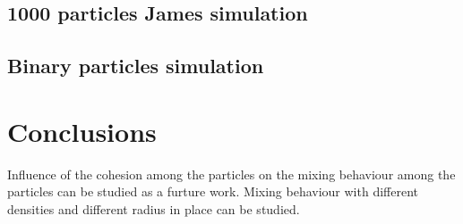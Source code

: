 \documentclass[preprint,12pt]{elsarticle}
\begin{document}
\subsection*{1000 particles James simulation}

\subsection*{Binary particles simulation}


\FloatBarrier%
\section{Conclusions}
\label{sec:conclusions}

Influence of the cohesion among the particles on the mixing behaviour among
the particles can be studied as a furture work. Mixing behaviour with
different densities and different radius in place can be studied.






\end{document}
